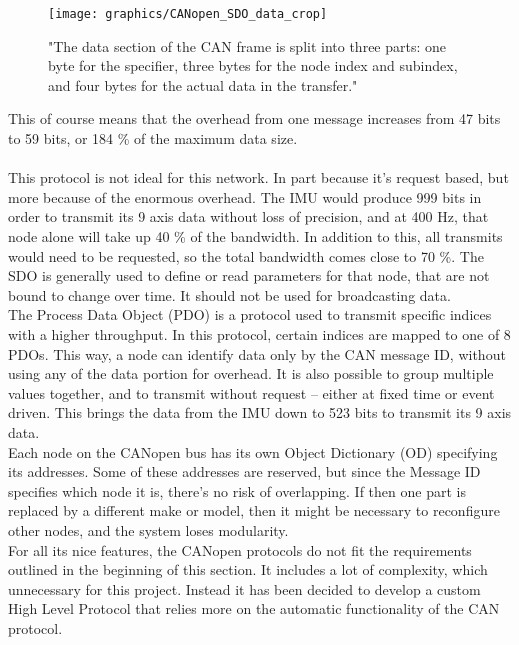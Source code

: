 \begin{figure}[h]
	\centering
	\texttt{[image: graphics/CANopen\_SDO\_data\_crop]}
	\caption{"The data section of the CAN frame is split into three parts: one byte for the specifier, three bytes for the node index and subindex, and four bytes for the actual data in the transfer."\cite{CANopen_introduction}}
	\label{fig:CANopen_SDO_data}
\end{figure}

This of course means that the overhead from one message increases from 47 bits to 59 bits, or 184 \% of the maximum data size.
\\~\\
This protocol is not ideal for this network. 
In part because it's request based, but more because of the enormous overhead.
The IMU would produce 999 bits in order to transmit its 9 axis data without loss of precision, and at 400 Hz, that node alone will take up 40 \% of the bandwidth.
In addition to this, all transmits would need to be requested, so the total bandwidth comes close to 70 \%.
The SDO is generally used to define or read parameters for that node, that are not bound to change over time.
It should not be used for broadcasting data.
\\
The Process Data Object (PDO) is a protocol used to transmit specific indices with a higher throughput. 
In this protocol, certain indices are mapped to one of 8 PDOs. 
This way, a node can identify data only by the CAN message ID, without using any of the data portion for overhead.
It is also possible to group multiple values together, and to transmit without request -- either at fixed time or event driven.
This brings the data from the IMU down to 523 bits to transmit its 9 axis data.\\

Each node on the CANopen bus has its own Object Dictionary (OD) specifying its addresses. 
Some of these addresses are reserved, but since the Message ID specifies which node it is, there's no risk of overlapping.
If then one part is replaced by a different make or model, then it might be necessary to reconfigure other nodes, and the system loses modularity.\\

For all its nice features, the CANopen protocols do not fit the requirements outlined in the beginning of this section. 
It includes a lot of complexity, which unnecessary for this project.
Instead it has been decided to develop a custom High Level Protocol that relies more on the automatic functionality of the CAN protocol.\\

